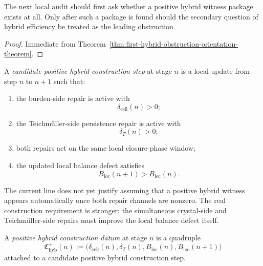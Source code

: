 \begin{corollary}
\label{cor:current-hybrid-balancing-obstruction-rule}
The next local audit should first ask whether a positive hybrid witness package exists at all. Only after such a package is found should the secondary question of hybrid efficiency be treated as the leading obstruction.
\end{corollary}

\begin{proof}
Immediate from Theorem~\ref{thm:first-hybrid-obstruction-orientation-theorem}.
\end{proof}




\begin{definition}
\label{def:candidate-positive-hybrid-construction-step}
A \emph{candidate positive hybrid construction step} at stage $n$ is a local update from step $n$ to $n+1$ such that:
\begin{enumerate}[leftmargin=2em,label=(\alph*)]
  \item the burden-side repair is active with
  \[
    \delta_{\mathrm{cell}}(n)>0;
  \]
  \item the Teichm\"uller-side persistence repair is active with
  \[
    \delta_T(n)>0;
  \]
  \item both repairs act on the same local closure-phase window;
  \item the updated local balance defect satisfies
  \[
    B_{\mathrm{loc}}(n+1)>B_{\mathrm{loc}}(n).
  \]
\end{enumerate}
\end{definition}

\begin{remark}
\label{rem:why-construction-phrased-this-way}
The current line does not yet justify assuming that a positive hybrid witness appears automatically once both repair channels are nonzero.
The real construction requirement is stronger: the simultaneous crystal-side and Teichm\"uller-side repairs must improve the local balance defect itself.
\end{remark}

\begin{definition}
\label{def:positive-hybrid-construction-datum}
A \emph{positive hybrid construction datum} at stage $n$ is a quadruple
\[
  \mathfrak C_{\mathrm{hyb}}^{+}(n)
  :=
  \bigl(
    \delta_{\mathrm{cell}}(n),
    \delta_T(n),
    B_{\mathrm{loc}}(n),
    B_{\mathrm{loc}}(n+1)
  \bigr)
\]
attached to a candidate positive hybrid construction step.
\end{definition}

